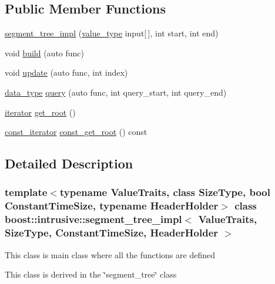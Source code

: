 \subsection*{Public Member Functions}
\begin{DoxyCompactItemize}
\item 
\hyperlink{classboost_1_1intrusive_1_1segment__tree__impl_abda73e6d62b92e32db5df65cb425ac59}{segment\+\_\+tree\+\_\+impl} (\hyperlink{classboost_1_1intrusive_1_1segment__tree__impl_ab1fd253eacbcdbacb8e5e73fc580626d}{value\+\_\+type} input\mbox{[}$\,$\mbox{]}, int start, int end)
\item 
void \hyperlink{classboost_1_1intrusive_1_1segment__tree__impl_a1b2e8afd13fc6e33640665efa2677dba}{build} (auto func)
\item 
void \hyperlink{classboost_1_1intrusive_1_1segment__tree__impl_a527965bd8a82b220f6a46c65fb97c335}{update} (auto func, int index)
\item 
\hyperlink{classboost_1_1intrusive_1_1segment__tree__impl_a92c83c631da1bcdaa004756ea98b2ec5}{data\+\_\+type} \hyperlink{classboost_1_1intrusive_1_1segment__tree__impl_ad0aa848ccb9520e36cf4dfbf9149b150}{query} (auto func, int query\+\_\+start, int query\+\_\+end)
\item 
\hyperlink{classboost_1_1intrusive_1_1segment__tree__impl_a9f1be9b01be5078fb59b2e34520b374a}{iterator} \hyperlink{classboost_1_1intrusive_1_1segment__tree__impl_a684131001e17323dfbf6b1781c632471}{get\+\_\+root} ()
\item 
\hyperlink{classboost_1_1intrusive_1_1segment__tree__impl_a6957e501101f1d5427f611f6ee8d1ded}{const\+\_\+iterator} \hyperlink{classboost_1_1intrusive_1_1segment__tree__impl_a562cca39fe52f31330ff71f32d58fb72}{const\+\_\+get\+\_\+root} () const
\end{DoxyCompactItemize}


\subsection{Detailed Description}
\subsubsection*{template$<$typename Value\+Traits, class Size\+Type, bool Constant\+Time\+Size, typename Header\+Holder$>$\newline
class boost\+::intrusive\+::segment\+\_\+tree\+\_\+impl$<$ Value\+Traits, Size\+Type, Constant\+Time\+Size, Header\+Holder $>$}


\begin{DoxyItemize}
\item This class is main class where all the functions are defined 
\item This class is derived in the \char`\"{}segment\+\_\+tree\char`\"{} class  
\end{DoxyItemize}

